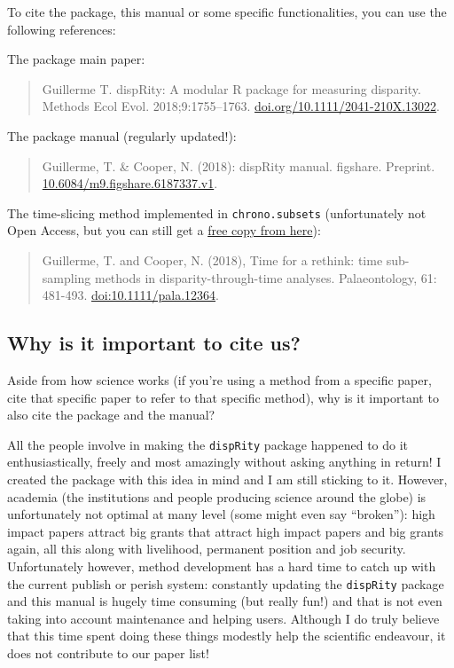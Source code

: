 \documentclass[]{book}
\begin{document}
To cite the package, this manual or some specific functionalities, you can use the following references:

The package main paper:

\begin{quote}
Guillerme T. dispRity: A modular R package for measuring disparity. Methods Ecol Evol. 2018;9:1755--1763. \href{https://doi.org/10.1111/2041-210X.13022}{doi.org/10.1111/2041-210X.13022}.
\end{quote}

The package manual (regularly updated!):

\begin{quote}
Guillerme, T. \& Cooper, N. (2018): dispRity manual. figshare. Preprint. \href{https://doi.org/10.6084/m9.figshare.6187337.v1}{10.6084/m9.figshare.6187337.v1}.
\end{quote}

The time-slicing method implemented in \texttt{chrono.subsets} (unfortunately not Open Access, but you can still get a \href{https://tguillerme.github.io/papers/Guillerme\&Cooper-2018-Palaeontology.pdf}{free copy from here}):

\begin{quote}
Guillerme, T. and Cooper, N. (2018), Time for a rethink: time sub-sampling methods in disparity-through-time analyses. Palaeontology, 61: 481-493. \href{https://onlinelibrary.wiley.com/doi/abs/10.1111/pala.12364}{doi:10.1111/pala.12364}.
\end{quote}

\hypertarget{why-is-it-important-to-cite-us}{%
\subsection{Why is it important to cite us?}\label{why-is-it-important-to-cite-us}}

Aside from how science works (if you're using a method from a specific paper, cite that specific paper to refer to that specific method), why is it important to also cite the package and the manual?

All the people involve in making the \texttt{dispRity} package happened to do it enthusiastically, freely and most amazingly without asking anything in return!
I created the package with this idea in mind and I am still sticking to it.
However, academia (the institutions and people producing science around the globe) is unfortunately not optimal at many level (some might even say ``broken''): high impact papers attract big grants that attract high impact papers and big grants again, all this along with livelihood, permanent position and job security.
Unfortunately however, method development has a hard time to catch up with the current publish or perish system: constantly updating the \texttt{dispRity} package and this manual is hugely time consuming (but really fun!) and that is not even taking into account maintenance and helping users.
Although I do truly believe that this time spent doing these things modestly help the scientific endeavour, it does not contribute to our paper list!
\end{document}
